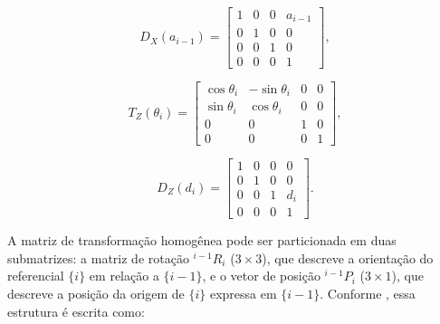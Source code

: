 \begin{equation}
D_X(a_{i-1}) =
\begin{bmatrix}
1 & 0 & 0 & a_{i-1} \\
0 & 1 & 0 & 0 \\
0 & 0 & 1 & 0 \\
0 & 0 & 0 & 1
\end{bmatrix},
\end{equation}

\begin{equation}
T_Z(\theta_i) =
\begin{bmatrix}
\cos\theta_i & -\sin\theta_i & 0 & 0 \\
\sin\theta_i &  \cos\theta_i & 0 & 0 \\
0 & 0 & 1 & 0 \\
0 & 0 & 0 & 1
\end{bmatrix},
\end{equation}

\begin{equation}
    \label{eq_Dz}
D_Z(d_i) =
\begin{bmatrix}
1 & 0 & 0 & 0 \\
0 & 1 & 0 & 0 \\
0 & 0 & 1 & d_i \\
0 & 0 & 0 & 1
\end{bmatrix}.
\end{equation}





A matriz de transformação homogênea pode ser particionada em duas submatrizes: a matriz de rotação ${}^{i-1}R_i$ ($3 \times 3$), que descreve a orientação do referencial $\{i\}$ em relação a $\{i-1\}$, e o vetor de posição ${}^{i-1}P_i$ ($3 \times 1$), que descreve a posição da origem de $\{i\}$ expressa em $\{i-1\}$.
Conforme \cite{craig2005}, essa estrutura é escrita como:


